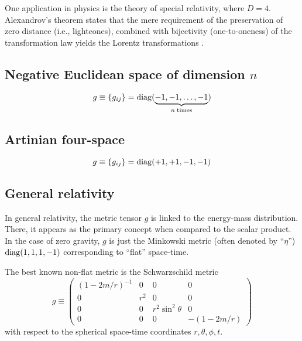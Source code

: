 One application in physics is the theory of special relativity,
where $D=4$.
Alexandrov's theorem states that the mere requirement of the preservation of
zero distance (i.e., lightcones), combined with bijectivity (one-to-oneness) of the transformation law
yields the Lorentz transformations
\cite{alex1,alex2,alex3,alex-col,borchers-heger,benz,lester,svozil-2001-convention}.



\subsection*{Negative Euclidean space of dimension $n$}

\begin{equation}
g\equiv \{g_{ij}\}={\rm diag} (\underbrace{-1,-1,\ldots ,-1}_{n\; {\rm times}})
\end{equation}

\subsection*{Artinian four-space}

\begin{equation}
g\equiv \{g_{ij}\}={\rm diag} (+1,+1,-1 ,-1)
\end{equation}



\subsection*{General relativity}

In general relativity, the metric tensor $g$ is linked to the energy-mass distribution.
There, it appears as the primary concept when compared to the scalar product.
In the case of zero gravity, $g$ is just the  Minkowski metric (often denoted by  ``$\eta$'')
${\rm diag} (1,1,1,-1) $ corresponding to ``flat'' space-time.

The best known non-flat metric is the Schwarzschild metric
\begin{equation}
g
\equiv
\begin{pmatrix}
(1-2m/r)^{-1}&0&0&0\\
0&r^2&0&0\\
0&0&r^2\sin^2 \theta &0\\
0&0&0&- \left( 1-{2m/r}\right)
\end{pmatrix}
\end{equation}
with respect to the spherical space-time coordinates $r,\theta ,\phi ,t$.

